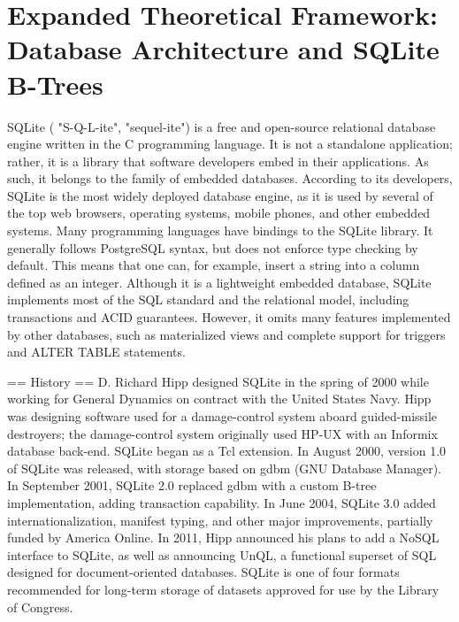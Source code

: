 \section{Expanded Theoretical Framework: Database Architecture and SQLite B-Trees}
SQLite ( "S-Q-L-ite",  "sequel-ite") is a free and open-source relational database engine written in the C programming language. It is not a standalone application; rather, it is a library that software developers embed in their applications. As such, it belongs to the family of embedded databases. According to its developers, SQLite is the most widely deployed database engine, as it is used by several of the top web browsers, operating systems, mobile phones, and other embedded systems.
Many programming languages have bindings to the SQLite library. It generally follows PostgreSQL syntax, but does not enforce type checking by default. This means that one can, for example, insert a string into a column defined as an integer. Although it is a lightweight embedded database, SQLite implements most of the SQL standard and the relational model, including transactions and ACID guarantees. However, it omits many features implemented by other databases, such as materialized views and complete support for triggers and ALTER TABLE statements.


== History ==
D. Richard Hipp designed SQLite in the spring of 2000 while working for General Dynamics on contract with the United States Navy. Hipp was designing software used for a damage-control system aboard guided-missile destroyers; the damage-control system originally used HP-UX with an Informix database back-end. SQLite began as a Tcl extension.
In August 2000, version 1.0 of SQLite was released, with storage based on gdbm (GNU Database Manager). In September 2001, SQLite 2.0 replaced gdbm with a custom B-tree implementation, adding transaction capability. In June 2004, SQLite 3.0 added internationalization, manifest typing, and other major improvements, partially funded by America Online. In 2011, Hipp announced his plans to add a NoSQL interface to SQLite, as well as announcing UnQL, a functional superset of SQL designed for document-oriented databases.
SQLite is one of four formats recommended for long-term storage of datasets approved for use by the Library of Congress.



